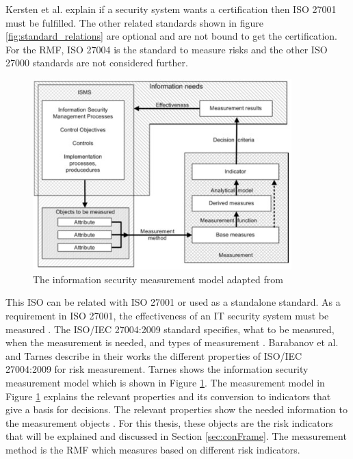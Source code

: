 Kersten et al. \cite{kersten_reuter_schroeder_wolfenstetter_2013} explain if a security system wants a certification then ISO 27001 must be fulfilled. The other related standards shown in figure \ref{fig:standard_relations} are optional and are not bound to get the certification. For the RMF, ISO 27004 is the standard to measure risks and the other ISO 27000 standards are not considered further.

\begin{figure}[ht!]
  \centering
  \includegraphics[width=10cm]{pictures/is_measurement_model.jpg}
  \caption{The information security measurement model adapted from \cite{tarnes2012information}}
  \label{fig:is_measurement_model}
\end{figure}

This ISO can be related with ISO 27001 or used as a standalone standard. As a requirement in ISO 27001, the effectiveness of an IT security system must be measured \cite{barabanov2011information}. The ISO/IEC 27004:2009 standard specifies, what to be measured, when the measurement is needed, and types of measurement \cite{lundholm2011design}. Barabanov et al. \cite{barabanov2011information} and Tarnes \cite{tarnes2012information} describe in their works the different properties of ISO/IEC 27004:2009 for risk measurement. Tarnes shows the information security measurement model which is shown in Figure \ref{fig:is_measurement_model}.
The measurement model in Figure \ref{fig:is_measurement_model} explains the relevant properties and its conversion to indicators that give a basis for decisions. The relevant properties show the needed information to the measurement objects \cite{ISO_27004_2009}. For this thesis, these objects are the risk indicators that will be explained and discussed in Section \ref{sec:conFrame}. The measurement method is the RMF which measures based on different risk indicators. \\


